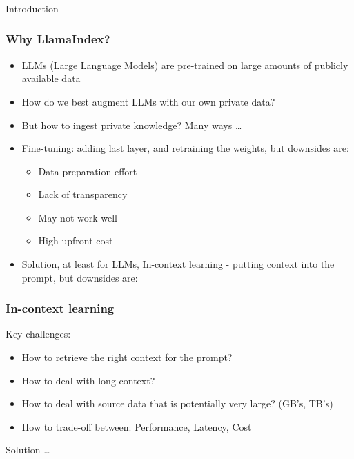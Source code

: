 \begin{frame}[fragile]\frametitle{}
\begin{center}
{\Large Introduction}
\end{center}
\end{frame}

\begin{frame}[fragile]\frametitle{Why LlamaIndex?}

\begin{itemize}
\item LLMs (Large Language Models) are pre-trained on large amounts of publicly available data
\item How do we best augment LLMs with our own private data?
\item But how to ingest private knowledge? Many ways \ldots
\item Fine-tuning: adding last layer, and retraining the weights, but downsides are:
	\begin{itemize}
	\item Data preparation effort
	\item Lack of transparency
	\item May not work well
	\item High upfront cost
	\end{itemize}	
	
\item Solution, at least for LLMs, In-context learning - putting context into the prompt, but downsides are:
\end{itemize}	


\end{frame}

\begin{frame}[fragile]\frametitle{In-context learning}

Key challenges:

\begin{itemize}
\item How to retrieve the right context for the prompt?
\item How to deal with long context? 
\item How to deal with source data that is potentially very large? (GB’s, TB’s) 
\item How to trade-off between: Performance, Latency, Cost
\end{itemize}	

Solution \ldots

\end{frame}


